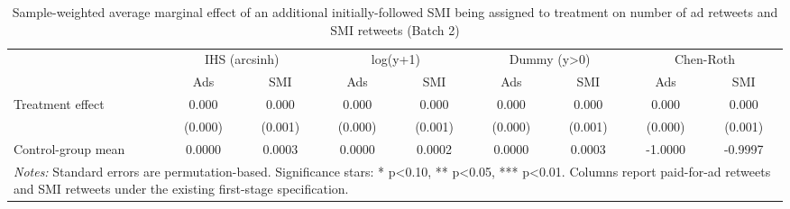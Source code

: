 \begin{table}[!htbp]
\centering
\caption{Sample-weighted average marginal effect of an additional initially-followed SMI being assigned to treatment on number of ad retweets and SMI retweets (Batch 2)}
\begin{tabular}{lcccccccc}
\hline
 & \multicolumn{2}{c}{IHS (arcsinh)} & \multicolumn{2}{c}{log(y+1)} & \multicolumn{2}{c}{Dummy (y>0)} & \multicolumn{2}{c}{Chen-Roth} \\
 & Ads & SMI & Ads & SMI & Ads & SMI & Ads & SMI \\
\hline
Treatment effect & 0.000 & 0.000 & 0.000 & 0.000 & 0.000 & 0.000 & 0.000 & 0.000 \\
 & (0.000) & (0.001) & (0.000) & (0.001) & (0.000) & (0.001) & (0.000) & (0.001) \\
Control-group mean & 0.0000 & 0.0003 & 0.0000 & 0.0002 & 0.0000 & 0.0003 & -1.0000 & -0.9997 \\
\hline
\multicolumn{9}{l}{\parbox[t]{15.5cm}{\textit{Notes:} Standard errors are permutation-based. Significance stars: * p<0.10, ** p<0.05, *** p<0.01. Columns report paid-for-ad retweets and SMI retweets under the existing first-stage specification.}} \\
\end{tabular}
\end{table}
